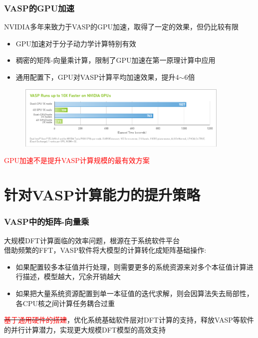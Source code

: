 \frame
{
	\frametitle{\textrm{VASP}的\textrm{GPU}加速}
\textrm{NVIDIA}多年来致力于\textrm{VASP}的\textrm{GPU}加速，取得了一定的效果，但仍比较有限
\begin{itemize}
	\item \textrm{GPU}加速对于分子动力学计算特别有效
	\item 稠密的矩阵-向量乘计算，限制了\textrm{GPU}加速在第一原理计算中应用
	\item 通用配置下，\textrm{GPU}对\textrm{VASP}计算平均加速效果，提升\textrm{4$\sim$6}倍
\end{itemize}
\begin{figure}[h!]
	\vspace{-0.15in}
\centering
\includegraphics[height=1.2in,width=4.05in,viewport=0 0 850 260,clip]{Figures/VASP-GPU-CPU.png}
\label{VASP_GPU}
\end{figure} 
	\vspace{-0.15in}
\textcolor{red}{\textrm{GPU}加速不是提升\textrm{VASP}计算规模的最有效方案}
}

\section{针对\rm{VASP}计算能力的提升策略}
\begin{frame}
	\frametitle{\textrm{VASP}中的矩阵-向量乘}
	大规模\textrm{DFT}计算面临的效率问题，根源在于系统软件平台\\
	{\fontsize{7.2pt}{5.2pt}}
	\vskip 3pt 
借助频繁的\textrm{FFT}，\textrm{VASP}软件将大模型的计算转化成矩阵基础操作:\\
{\fontsize{7.2pt}{5.2pt}}
	\begin{itemize}
		\item 如果配置较多本征值并行处理，则需要更多的系统资源来对多个本征值计算进行描述，模型越大，冗余开销越大\\
			{\fontsize{7.2pt}{5.2pt}\selectfont{可能影响软件的实用性，甚至超过了现有计算机集群的处理极限}}
		\item 如果把大量系统资源配置到单一本征值的迭代求解，则会因算法失去局部性，各\textrm{CPU}核之间计算任务耦合过重\\
	{\fontsize{7.2pt}{5.2pt}\selectfont{可能造成系统过载}}
	\end{itemize}
	\sout{\textcolor{red}{基于通用硬件的搭建}}，优化系统基础软件层对\textrm{DFT}计算的支持，释放\textrm{VASP}等软件的并行计算潜力，实现更大规模\textrm{DFT}模型的高效支持
\end{frame}

